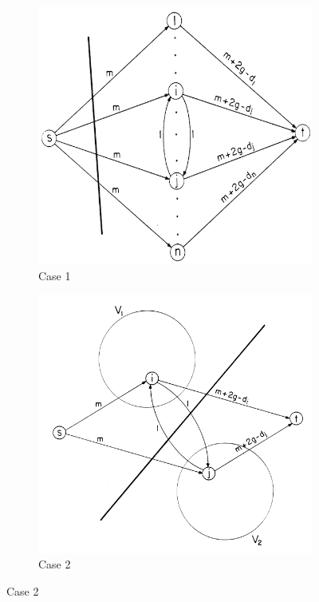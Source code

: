 \documentclass{article}
\begin{document}
\begin{figure}[H]
  \centering
  \begin{subfigure}{.48\textwidth}
    \includegraphics[width=\textwidth]{goldberg_network_cut1.png}
    \caption{Case 1}
  \end{subfigure}
  \begin{subfigure}{.48\textwidth}
    \includegraphics[width=\textwidth]{goldberg_network_cut2.png}
    \caption{Case 2}
  \end{subfigure}
\end{figure}
\end{document}
